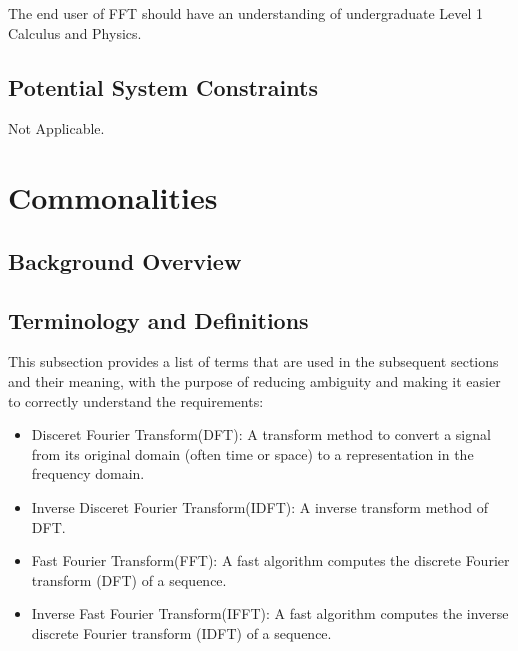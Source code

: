 \documentclass[12pt]{article}
\newcommand{\famname}{FFT} %
\begin{document}
The end user of \famname{} should have an understanding of undergraduate Level
1 Calculus and Physics.

\subsection{Potential System Constraints}
Not Applicable.

\section{Commonalities}

\subsection{Background Overview} \label{Sec_Background}


\subsection{Terminology and  Definitions}

This subsection provides a list of terms that are used in the subsequent
sections and their meaning, with the purpose of reducing ambiguity and making it
easier to correctly understand the requirements:

\begin{itemize}
\item Disceret Fourier Transform(DFT): A transform method to convert a signal from its original domain (often time or space) to a representation in the frequency domain.
\end{itemize}

\begin{itemize}
\item Inverse Disceret Fourier Transform(IDFT): A inverse transform method of DFT. 
\end{itemize}

\begin{itemize}
\item Fast Fourier Transform(FFT): A fast algorithm computes the discrete Fourier transform (DFT) of a sequence.
\end{itemize}

\begin{itemize}
\item Inverse Fast Fourier Transform(IFFT): A fast algorithm computes the inverse discrete Fourier transform (IDFT) of a sequence.
\end{itemize}
\end{document}
